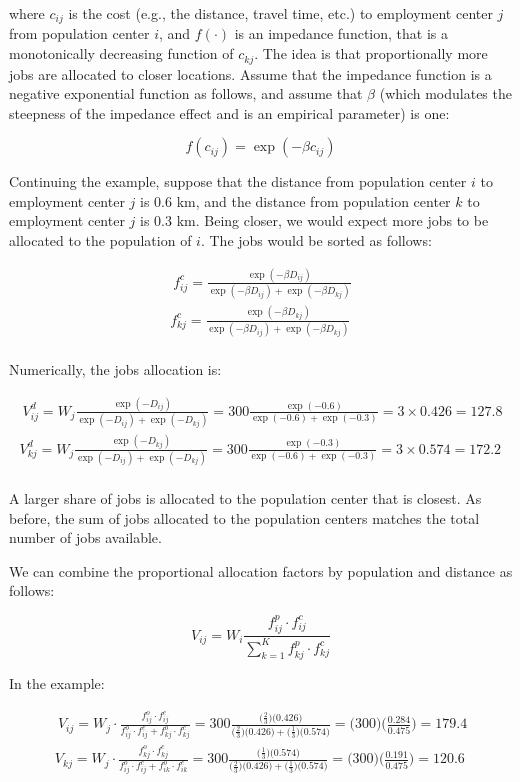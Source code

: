 \documentclass[]{elsarticle} %
\begin{document}
\noindent where \(c_{ij}\) is the cost (e.g., the distance, travel time,
etc.) to employment center \(j\) from population center \(i\), and
\(f(\cdot)\) is an impedance function, that is a monotonically
decreasing function of \(c_{kj}\). The idea is that proportionally more
jobs are allocated to closer locations. Assume that the impedance
function is a negative exponential function as follows, and assume that
\(\beta\) (which modulates the steepness of the impedance effect and is
an empirical parameter) is one:

\[
f(c_{ij}) = \exp(-\beta c_{ij})
\]

Continuing the example, suppose that the distance from population center
\(i\) to employment center \(j\) is 0.6 km, and the distance from
population center \(k\) to employment center \(j\) is 0.3 km. Being
closer, we would expect more jobs to be allocated to the population of
\(i\). The jobs would be sorted as follows:

\[
\begin{array}{l}\
f^c_{ij} = \frac{\exp(-\beta D_{ij})}{\exp(-\beta D_{ij}) + \exp(-\beta D_{kj})}\\
f^c_{kj} = \frac{\exp(-\beta D_{kj})}{\exp(-\beta D_{ij}) + \exp(-\beta D_{kj})}\\
\end{array}
\]

Numerically, the jobs allocation is:

\[
\begin{array}{l}\
V^d_{ij} = W_j\frac{\exp(-D_{ij})}{\exp(-D_{ij}) + \exp(-D_{kj})} = 300\frac{\exp(-0.6)}{\exp(-0.6) + \exp(-0.3)} = 3\times 0.426 = 127.8\\
V^d_{kj} = W_j\frac{\exp(-D_{kj})}{\exp(-D_{ij}) + \exp(-D_{kj})} = 300\frac{\exp(-0.3)}{\exp(-0.6) + \exp(-0.3)} = 3\times  0.574 = 172.2\\
\end{array}
\]

A larger share of jobs is allocated to the population center that is
closest. As before, the sum of jobs allocated to the population centers
matches the total number of jobs available.

We can combine the proportional allocation factors by population and
distance as follows:

\[
V_{ij} = W_i\frac{f^p_{ij} \cdot f^c_{ij}}{\sum_{k=1}^K f^p_{kj} \cdot f^c_{kj}}
\]

In the example:

\[
\begin{array}{l}\
V_{ij} = W_j\cdot \frac{f^o_{ij} \cdot f^c_{ij}}{f^o_{ij} \cdot f^c_{ij} + f^o_{kj} \cdot f^c_{kj}} = 300 \frac{\big(\frac{2}{3} \big) \big(0.426 \big)}{\big(\frac{2}{3} \big) \big(0.426 \big) + \big(\frac{1}{3} \big) \big(0.574 \big)} = \big(300 \big)\big(\frac{0.284}{0.475} \big)= 179.4\\
V_{kj} = W_j\cdot \frac{f^o_{kj} \cdot f^c_{kj}}{f^o_{ij} \cdot f^c_{ij} + f^o_{ik} \cdot f^c_{ik}} = 300 \frac{\big(\frac{1}{3} \big) \big(0.574 \big)}{\big(\frac{2}{3} \big) \big(0.426 \big) + \big(\frac{1}{3} \big) \big(0.574 \big)}  = \big(300 \big)\big(\frac{0.191}{0.475} \big)= 120.6 \\
\end{array}
\]
\end{document}
